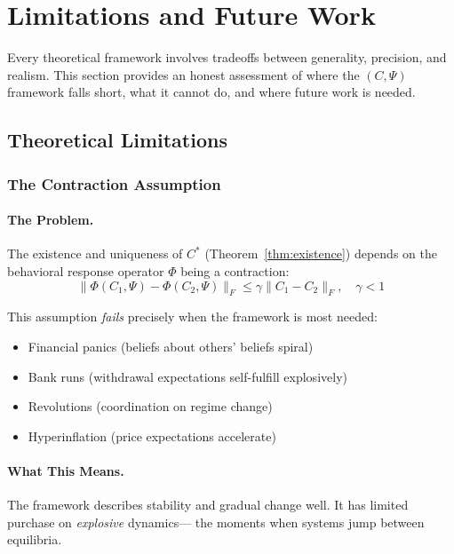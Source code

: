 \section{Limitations and Future Work}
\label{sec:limitations}

Every theoretical framework involves tradeoffs between generality, precision, and realism.
This section provides an honest assessment of where the $(C, \Psi)$ framework
falls short, what it cannot do, and where future work is needed.

\subsection{Theoretical Limitations}

\subsubsection{The Contraction Assumption}

\paragraph{The Problem.}
The existence and uniqueness of $C^*$ (Theorem~\ref{thm:existence}) depends on 
the behavioral response operator $\Phi$ being a contraction:
\begin{equation}
  \|\Phi(C_1, \Psi) - \Phi(C_2, \Psi)\|_F \leq \gamma \|C_1 - C_2\|_F, \quad \gamma < 1
\end{equation}

This assumption \emph{fails} precisely when the framework is most needed:
\begin{itemize}
  \item Financial panics (beliefs about others' beliefs spiral)
  \item Bank runs (withdrawal expectations self-fulfill explosively)
  \item Revolutions (coordination on regime change)
  \item Hyperinflation (price expectations accelerate)
\end{itemize}

\paragraph{What This Means.}
The framework describes stability and gradual change well.
It has limited purchase on \emph{explosive} dynamics---
the moments when systems jump between equilibria.

